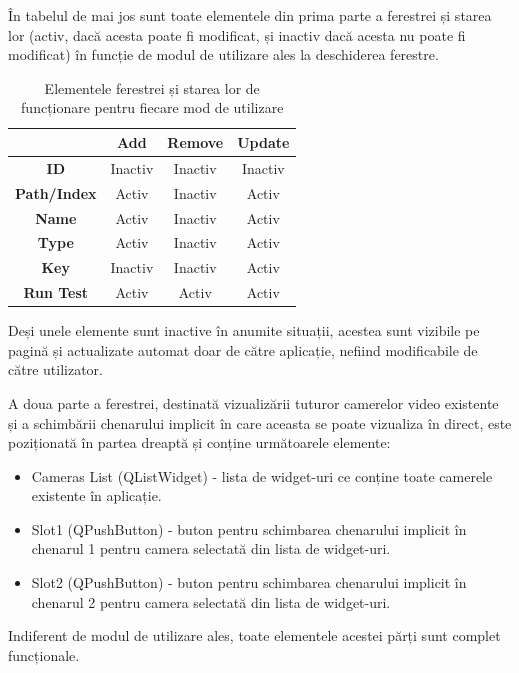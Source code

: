 \documentclass[12pt]{article}
\begin{document}
\^{I}n tabelul de mai jos sunt toate elementele din prima parte a ferestrei și starea lor (activ, dac\u{a} acesta poate fi modificat, și inactiv dac\u{a} acesta nu poate fi modificat) \^{i}n funcție de modul de utilizare ales la deschiderea ferestre.

\begin{table}[h]
\centering
\begin{tabular}{|c|c|c|c|}
\hline
  & \textbf{Add} & \textbf{Remove} & \textbf{Update} \\
\hline
\textbf{ID} & Inactiv & Inactiv & Inactiv \\
\hline
\textbf{Path/Index} & Activ & Inactiv & Activ \\
\hline
\textbf{Name} & Activ & Inactiv & Activ \\
\hline
\textbf{Type} & Activ & Inactiv & Activ \\
\hline
\textbf{Key} & Inactiv & Inactiv & Activ \\
\hline
\textbf{Run Test} & Activ & Activ & Activ \\
\hline
\end{tabular}
\caption{Elementele ferestrei și starea lor de funcționare pentru fiecare mod de utilizare}
\end{table}

Deși unele elemente sunt inactive \^{i}n anumite situații, acestea sunt vizibile pe pagin\u{a} și actualizate automat doar de c\u{a}tre aplicație, nefiind modificabile de c\u{a}tre utilizator. 

A doua parte a ferestrei, destinat\u{a} vizualiz\u{a}rii tuturor camerelor video existente și a schimb\u{a}rii chenarului implicit \^{i}n care aceasta se poate vizualiza \^{i}n direct, este poziționat\u{a} \^{i}n partea dreapt\u{a} și conține urm\u{a}toarele elemente:

\begin{itemize}
    \item Cameras List (QListWidget) - lista de widget-uri ce conține toate camerele existente \^{i}n aplicație.
    \item Slot1 (QPushButton) - buton pentru schimbarea chenarului implicit \^{i}n chenarul 1 pentru camera selectat\u{a} din lista de widget-uri.
    \item Slot2 (QPushButton) - buton pentru schimbarea chenarului implicit \^{i}n chenarul 2 pentru camera selectat\u{a} din lista de widget-uri.
\end{itemize}

Indiferent de modul de utilizare ales, toate elementele acestei p\u{a}rți sunt complet funcționale.
\end{document}
